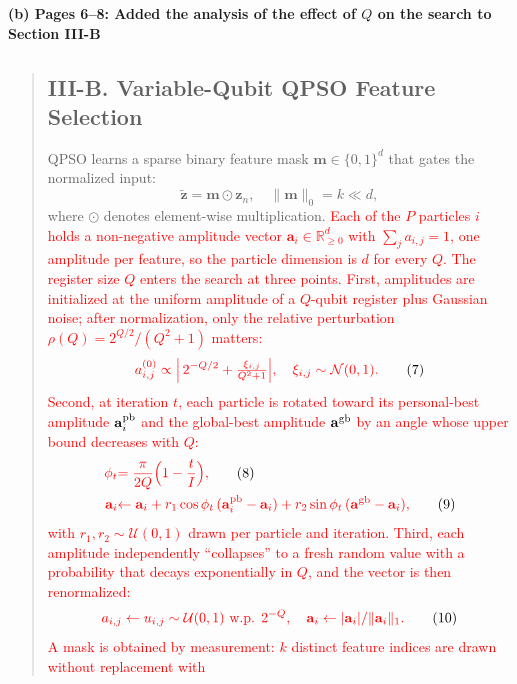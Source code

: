 \documentclass[11pt]{article}
\newenvironment{excerpt}{\begin{quote}\sloppy}{\end{quote}}
\newcommand{\mshead}[2]{\subsection*{\textbf{#1. #2}}}
\newcommand{\loc}[1]{\par\medskip\noindent\textbf{#1}\par}
\begin{document}
\loc{(b) Pages 6--8: Added the analysis of the effect of $Q$ on the search to Section III-B}
\begin{excerpt}
\mshead{III-B}{Variable-Qubit QPSO Feature Selection}


QPSO learns a sparse binary feature mask
$\mathbf{m}\in\{0,1\}^d$ that gates the normalized input:
\begin{equation}
\tilde{\mathbf{z}} = \mathbf{m}\odot\mathbf{z}_n,\quad
\|\mathbf{m}\|_0 = k \ll d,
\tag{6}
\end{equation}
where $\odot$ denotes element-wise multiplication.
\textcolor{red}{Each of the $P$ particles $i$ holds a
non-negative amplitude vector $\mathbf{a}_i\in\mathbb{R}_{\ge 0}^{d}$
with $\sum_j a_{i,j}=1$, one amplitude per feature, so the particle
dimension is $d$ for every $Q$. The register size $Q$ enters the
search at three points. First, amplitudes are initialized at the
uniform amplitude of a $Q$-qubit register plus Gaussian noise; after
normalization, only the relative perturbation
$\rho(Q)=2^{Q/2}/(Q^{2}+1)$ matters:}
\begin{equation}
\textcolor{red}{a_{i,j}^{(0)} \propto \Bigl|\,2^{-Q/2} +
\tfrac{\xi_{i,j}}{Q^{2}+1}\Bigr|,\quad
\xi_{i,j}\sim\mathcal{N}(0,1).}
\tag{7}
\end{equation}
\textcolor{red}{Second, at iteration $t$, each particle is
rotated toward its personal-best amplitude $\mathbf{a}_i^{\rm pb}$
and the global-best amplitude $\mathbf{a}^{\rm gb}$ by an angle whose
upper bound decreases with $Q$:}
\begin{align}
\textcolor{red}{\phi_t} &\textcolor{red}{= \frac{\pi}{2Q}\Bigl(1-\frac{t}{I}\Bigr),}
\tag{8}\\
\textcolor{red}{\mathbf{a}_i} &\textcolor{red}{\leftarrow \mathbf{a}_i
+ r_1\cos\phi_t\,(\mathbf{a}_i^{\rm pb}-\mathbf{a}_i)
+ r_2\sin\phi_t\,(\mathbf{a}^{\rm gb}-\mathbf{a}_i),}
\tag{9}
\end{align}
\textcolor{red}{with $r_1,r_2\sim\mathcal{U}(0,1)$ drawn per
particle and iteration. Third, each amplitude independently
``collapses'' to a fresh random value with a probability that decays
exponentially in $Q$, and the vector is then renormalized:}
\begin{equation}
\textcolor{red}{a_{i,j} \leftarrow u_{i,j}\sim\mathcal{U}(0,1)
\ \text{w.p. } 2^{-Q},\quad
\mathbf{a}_i \leftarrow |\mathbf{a}_i| / \|\mathbf{a}_i\|_1 .}
\tag{10}
\end{equation}
\textcolor{red}{A mask is obtained by measurement: $k$
distinct feature indices are drawn without replacement with
}
\end{excerpt}
\end{document}
